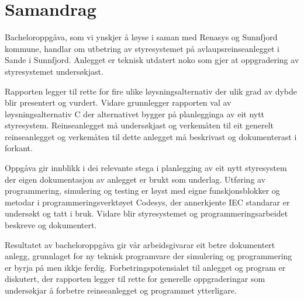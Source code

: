 \chapter{Samandrag}
\thispagestyle{romanpages}

Bacheloroppgåva, som vi ynskjer å løyse i saman med Renasys og Sunnfjord kommune, handlar om utbetring av styresystemet på 
avlaupsreinseanlegget i Sande i Sunnfjord. 
Anlegget er teknisk utdatert noko som gjer at oppgradering av styresystemet undersøkjast.

Rapporten legger til rette for fire ulike løysningsalternativ
der ulik grad av dybde blir presentert og vurdert. \newline
Vidare grunnlegger rapporten val av løysningsalternativ C der alternativet bygger på planlegginga av eit nytt styresystem. 
Reinseanlegget må undersøkjast og 
verkemåten til eit generelt reinseanlegget og verkemåten til dette anlegget må beskrivast og dokumenterast i forkant.

Oppgåva gir innblikk i dei relevante stega i planlegging av eit nytt styresystem der eigen dokumentasjon av anlegget er brukt som underlag. 
Utføring av programmering, simulering og testing er løyst med eigne funskjonsblokker og metodar i programmeringsverktøyet Codesys,
der annerkjente IEC standarar er undersøkt og tatt i bruk.
Vidare blir styresystemet og programmeringsarbeidet beskreve og dokumentert.

Resultatet av bacheloroppgåva gir vår arbeidsgivarar eit betre dokumentert anlegg, 
grunnlaget for ny teknisk programvare der simulering og programmering er byrja på men ikkje ferdig. \newline
Forbetringspotensialet til anlegget og program er diskutert, der rapporten legger til rette for generelle oppgraderingar
som undersøkjar å forbetre reinseanlegget og programmet ytterligare.